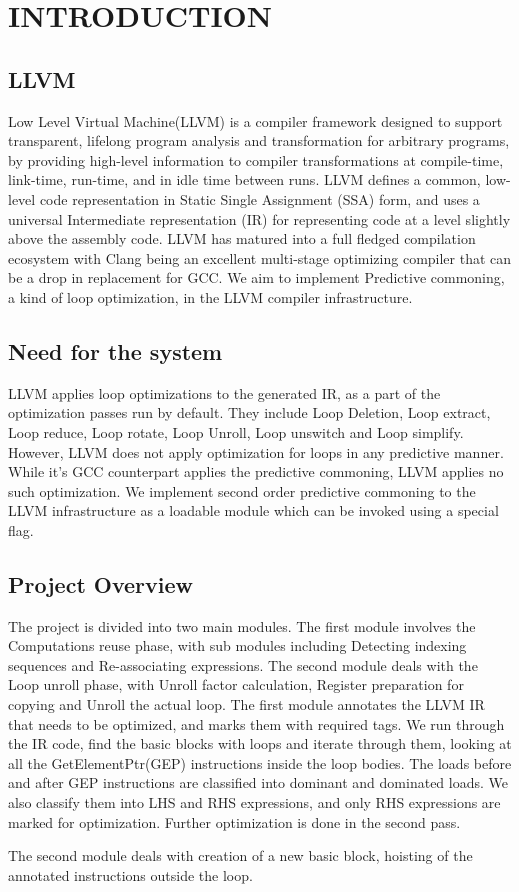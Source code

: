 
\chapter{INTRODUCTION} %
\section{LLVM} %
Low Level Virtual Machine(LLVM)\cite{Lattner:2004:LCF:977395.977673} is a compiler framework designed to support transparent, lifelong program analysis and transformation for arbitrary programs, by providing high-level information to compiler transformations at compile-time, link-time, run-time, and in idle time between runs. LLVM defines a common, low-level code representation in Static Single Assignment (SSA) form, and uses a universal Intermediate representation (IR) for representing code at a level slightly above the assembly code. LLVM has matured into a full fledged compilation ecosystem with Clang being an excellent multi-stage optimizing compiler that can be a drop in replacement for GCC. We aim to implement Predictive commoning, a kind of loop optimization, in the LLVM compiler infrastructure.

\section{Need for the system}
LLVM applies loop optimizations to the generated IR, as a part of the optimization passes run by default. They include Loop Deletion, Loop extract, Loop reduce, Loop rotate, Loop Unroll, Loop unswitch and Loop simplify. However, LLVM does not apply optimization for loops in any predictive manner. While it's GCC counterpart applies the predictive commoning, LLVM applies no such optimization. We implement second order predictive commoning to the LLVM infrastructure as a loadable module which can be invoked using a special flag.

\section{Project Overview} %
 The project is divided into two main modules. The first module involves the Computations reuse phase, with sub modules including Detecting indexing sequences and Re-associating expressions. The second module deals with the Loop unroll phase, with Unroll factor calculation, Register preparation for copying and Unroll the actual loop.
  The first module annotates the LLVM IR that needs to be optimized, and marks them with required tags. We run through the IR code, find the basic blocks with loops and iterate through them, looking at all the GetElementPtr(GEP) instructions inside the loop bodies. The loads before and after GEP instructions are classified into dominant and dominated loads. We also classify them into LHS and RHS expressions, and only RHS expressions are marked for optimization. Further optimization is done in the second pass.
  
  The second module deals with creation of a new basic block, hoisting of the annotated instructions outside the loop. 